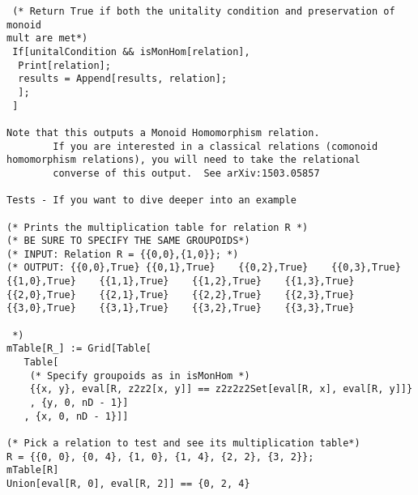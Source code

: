 \begin{lstlisting}
 (* Return True if both the unitality condition and preservation of monoid
mult are met*)
 If[unitalCondition && isMonHom[relation],
  Print[relation];
  results = Append[results, relation];
  ];
 ]

Note that this outputs a Monoid Homomorphism relation.
        If you are interested in a classical relations (comonoid homomorphism relations), you will need to take the relational 
        converse of this output.  See arXiv:1503.05857

Tests - If you want to dive deeper into an example

(* Prints the multiplication table for relation R *)
(* BE SURE TO SPECIFY THE SAME GROUPOIDS*)
(* INPUT: Relation R = {{0,0},{1,0}}; *)
(* OUTPUT: {{0,0},True} {{0,1},True}    {{0,2},True}    {{0,3},True}
{{1,0},True}    {{1,1},True}    {{1,2},True}    {{1,3},True}
{{2,0},True}    {{2,1},True}    {{2,2},True}    {{2,3},True}
{{3,0},True}    {{3,1},True}    {{3,2},True}    {{3,3},True}

 *)
mTable[R_] := Grid[Table[
   Table[
    (* Specify groupoids as in isMonHom *)
    {{x, y}, eval[R, z2z2[x, y]] == z2z2z2Set[eval[R, x], eval[R, y]]}
    , {y, 0, nD - 1}]
   , {x, 0, nD - 1}]]

(* Pick a relation to test and see its multiplication table*)
R = {{0, 0}, {0, 4}, {1, 0}, {1, 4}, {2, 2}, {3, 2}};
mTable[R]
Union[eval[R, 0], eval[R, 2]] == {0, 2, 4}
\end{lstlisting}
